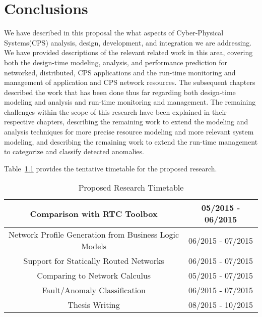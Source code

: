 \chapter{Conclusions}
\label{ch:conclusions}

We have described in this proposal the what aspects of Cyber-Physical Systems(CPS) analysis, design, development, and integration we are addressing.  We have provided descriptions of the relevant related work in this area, covering both the design-time modeling, analysis, and performance prediction for networked, distributed, CPS applications and the run-time monitoring and management of application and CPS network resources.  The subsequent chapters described the work that has been done thus far regarding both design-time modeling and analysis and run-time monitoring and management.  The remaining challenges within the scope of this research have been explained in their respective chapters, describing the remaining work to extend the modeling and analysis techniques for more precise resource modeling and more relevant system modeling, and describing the remaining work to extend the run-time management to categorize and classify detected anomalies.  

Table~\ref{table:timeline} provides the tentative timetable for the proposed research.
\begin{table}[h]
	\caption{Proposed Research Timetable}
	
	\begin{tabular}{| c | c |}
		\hline
		Comparison with RTC Toolbox & 05/2015 - 06/2015 \\\hline
		Network Profile Generation from Business Logic Models & 06/2015 - 07/2015 \\\hline
		Support for Statically Routed Networks & 06/2015 - 07/2015 \\\hline
		Comparing \shorttool to Network Calculus & 05/2015 - 07/2015 \\\hline
		Fault/Anomaly Classification & 06/2015 - 07/2015 \\\hline
		Thesis Writing & 08/2015 - 10/2015 \\\hline
	\end{tabular}
	\label{table:timeline}
\end{table}